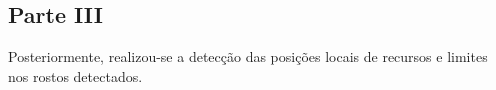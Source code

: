\documentclass[journal]{IEEEtran}
\begin{document}
\begin{figure}[h]
\centering
{}
\end{figure}
\floatBarrier	

\subsection*{Parte III}

Posteriormente, realizou-se a detecção das posições locais de recursos e limites nos rostos detectados.
\end{document}
